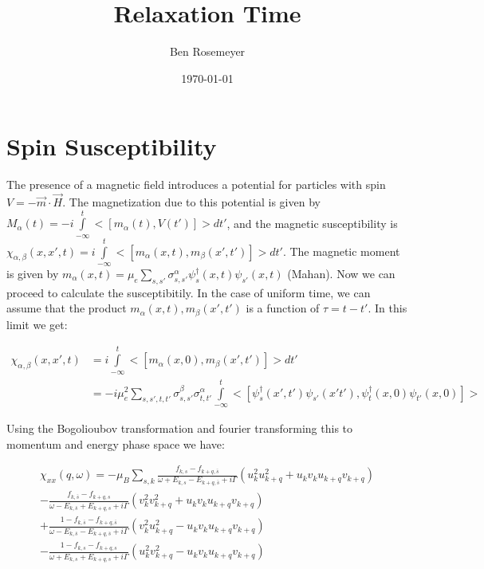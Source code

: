 \documentclass{article}
\begin{document}
\title{Relaxation Time}
\author{Ben Rosemeyer}
\date{\today}
\maketitle

\section*{Spin Susceptibility}
The presence of a magnetic field introduces a potential for particles with spin $V=-\vec{m}\cdot\vec{H}$. The magnetization due to this potential is given by $M_\alpha(t)=-i\int\limits_{-\infty}^t <[m_\alpha(t),V(t')]>dt'$, and the magnetic susceptibility is $\chi_{\alpha,\beta}(x,x',t)=i\int\limits_{-\infty}^t<[m_\alpha(x,t),m_\beta(x',t')]>dt'$. The magnetic moment is given by $m_\alpha(x,t)=\mu_e\sum\limits_{s,s'} \sigma^{\alpha}_{s,s'}\psi^\dagger_s(x,t) \psi_{s'}(x,t)$ (Mahan). Now we can proceed to calculate the susceptibitily. In the case of uniform time, we can assume that the product $m_\alpha(x,t),m_\beta(x',t')$ is a function of $\tau=t-t'$. In this limit we get:

\begin{align*}
\chi_{\alpha,\beta}(x,x',t)&=i\int\limits_{-\infty}^t<[m_\alpha(x,0),m_\beta(x',t')]>dt' \\ 
&=-i\mu_e^2\sum\limits_{s,s',t,t'}\sigma^{\beta}_{s,s'}\sigma^{\alpha}_{t,t'}\int\limits_{-\infty}^t<[\psi^\dagger_{s}(x',t') \psi_{s'}(x't'),\psi^\dagger_{t}(x,0) \psi_{t'}(x,0)]>
\end{align*}


Using the Bogolioubov transformation and fourier transforming this to momentum and energy phase space we have:

\begin{align*}
\chi_{xx}(q,\omega) = -\mu_{B} \sum\limits_{s,k} \frac{f_{k,s}-f_{k+q,\bar{s}}}{\omega + E_{k,s} - E_{k+q,\bar{s}} + i\Gamma}(u_k^2 u_{k+q}^2 + u_k v_k u_{k+q} v_{k+q}) \\
				  - \frac{f_{k,\bar{s}}-f_{k+q,s}}{\omega - E_{k,\bar{s}} + E_{k+q,s} + i\Gamma}(v_k^2 v_{k+q}^2 + u_k v_k u_{k+q} v_{k+q}) \\
				 +  \frac{1-f_{k,\bar{s}}-f_{k+q,\bar{s}}}{\omega - E_{k,\bar{s}} - E_{k+q,\bar{s}} + i\Gamma}(v_k^2 u_{k+q}^2 - u_k v_k u_{k+q} v_{k+q}) \\
				 - \frac{1-f_{k,s}-f_{k+q,s}}{\omega + E_{k,s} + E_{k+q,s} + i\Gamma}(u_k^2 v_{k+q}^2 - u_k v_k u_{k+q} v_{k+q})
\end{align*}
\end{document}
